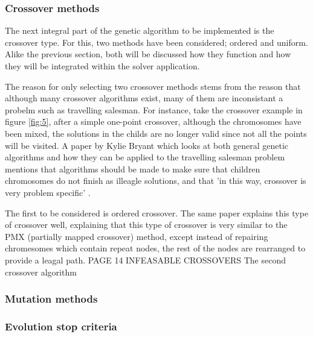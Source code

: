 \documentclass[article]{IEEEtran}
\begin{document}
\subsubsection{Crossover methods}
The next integral part of the genetic algorithm to be implemented is the crossover type. For this, two methods have been considered; ordered and uniform. Alike the previous section, both will be discussed how they function and how they will be integrated within the solver application. \par
The reason for only selecting two crossover methods stems from the reason that although many crossover algorithms exist, many of them are inconsistant a probelm such as travelling salesman. For instance, take the crossover example in figure \ref{fig:5}, after a simple one-point crossover, although the chromosomes have been mixed, the solutions in the childs are no longer valid since not all the points will be visited. A paper by Kylie Bryant which looks at both general genetic algorithms and how they can be applied to the travelling salesman problem mentions that algorithms should be made to make sure that children chromosomes do not finish as illeagle solutions, and that 'in this way, crossover is very problem specific' \cite{7}. \par
The first to be considered is ordered crossover. The same paper explains this type of crossover well, explaining that this type of crossover is very similar to the PMX (partially mapped crossover) method, except instead of repairing chromesomes which contain repeat nodes, the rest of the nodes are rearranged to provide a leagal path.
PAGE 14 INFEASABLE CROSSOVERS
The second crossover algorithm 

\subsubsection{Mutation methods}

\subsubsection{Evolution stop criteria}
\end{document}
